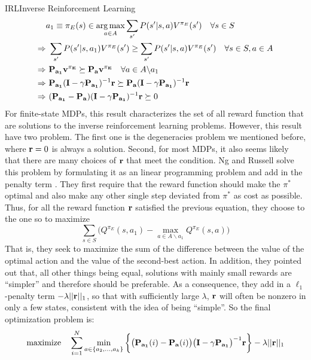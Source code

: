 \documentclass[9pt]{article}
\begin{document}
\begin{topic}{IRL}{Inverse Reinforcement Learning}
\begin{equation}
\begin{split}
& a_1 \equiv \pi_E(s) \in \operatorname*{arg\,max}_{a\in A} \sum_{s'} P(s'|s,a) V^{\pi_E}(s') \quad \forall s \in S\\
\Rightarrow &\ \sum_{s'} P(s'|s,a_1) V^{\pi_E}(s') \ge \sum_{s'} P(s'|s,a) V^{\pi_E}(s') \quad \forall s \in S, a\in A\\
\Rightarrow &\ \mathbf{P_{a_1}}  \mathbf{v^{\pi_E}} \succeq  \mathbf{P_a}  \mathbf{v^{\pi_E}}  \quad \forall a\in A \backslash a_1\\
\Rightarrow &\ \mathbf{P_{a_1}}(\mathbf{I} - \gamma\mathbf{P_{a_1}})^{-1} \mathbf{r} \succeq \mathbf{P_{a}}(\mathbf{I} - \gamma\mathbf{P_{a_1}})^{-1} \mathbf{r}\\
\Rightarrow &\ (\mathbf{P_{a_1}} - \mathbf{P_{a}})(\mathbf{I} - \gamma\mathbf{P_{a_1}})^{-1}\mathbf{r} \succeq 0
\end{split}
\end{equation}
For finite-state MDPs, this result characterizes the set of all reward function that  are solutions to the inverse reinforcement learning problems. However, this result have two problem. The first one is the degeneracies problem we mentioned before, where $\mathbf{r} = 0$ is always a solution. Second, for most MDPs, it also seems likely that there are many choices of $\mathbf{r}$ that meet the condition.  Ng and Russell solve this problem by formulating it as an linear programming problem and add in the penalty term \citep{Ng2000Algorithms}. They first require that the reward function should make the $\pi^*$ optimal and also make any other single step deviated from $\pi^*$ as cost as possible. Thus, for all the reward function $\mathbf{r}$ satisfied the previous equation, they choose to the one so to maximize
\[
\sum_{s\in S} \bigg(Q^{\pi_E}(s, a_1) - \max_{a\in A\backslash a_1}Q^{\pi_E}(s,a)\bigg)
\]
That is, they seek to maximize the sum of the difference between  the value of the optimal action and the value of the second-best action. In addition, they pointed out that, all other things being equal, solutions with mainly small rewards are ``simpler'' and therefore should be preferable. As a consequence, they add in a $\ell_1$-penalty term $-\lambda||\mathbf{r}||_1$, so that with sufficiently large $\lambda$, $\mathbf{r}$ will often be nonzero in only a few states, consistent with the idea of being ``simple''. So the final optimization problem is:
\[
\begin{split}
\text{maximize} & \quad \sum_{i=1}^{N} \min_{a\in \{a_2,\ldots,a_k\}}\bigg\{ \big(\mat{P_{a_1}}(i)-\mat{P_{a}}(i)\big)\big(\mat{I} - \gamma\mat{P_{a_1}}\big)^{-1}\mat{r} \bigg\}-\lambda ||\mat{r}||_1\\

\end{split}\]
\end{topic}
\end{document}
